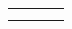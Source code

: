 \begin{landscape}
\begin{table}[]
{\begin{tabular}{lllllll}
\multicolumn{3}{l}{}                                                                                                                                                                                                                                                                                                                                                                                                                                                                                                                                                                                          &                         &                                                                                                                                                                  & \multicolumn{2}{l}{}                                                                                                                                                                                                                                                                     \\ \cline{1-3} \cline{5-7}
\multicolumn{7}{l}{}                                                                                                                                                                                                                                                                                                                                                                                                                                                                                                                                                                                                                                                                                                                                                                                                                                                                                                                                                                                                                                                                                  \\

\end{tabular}}
\end{table}
\end{landscape}
